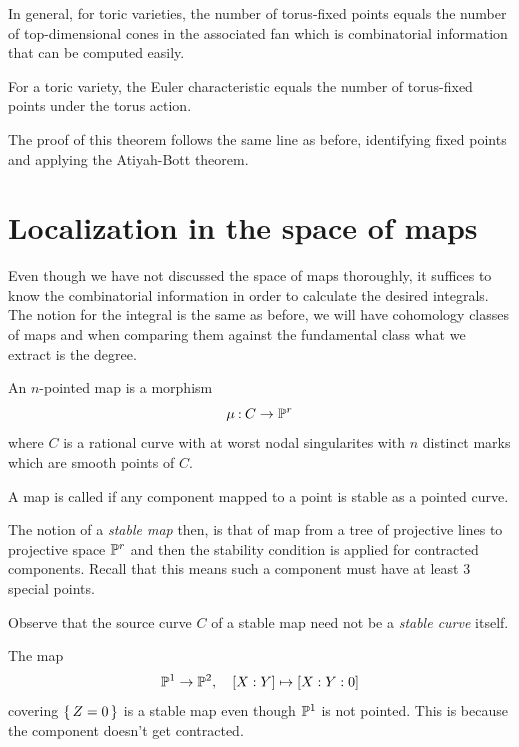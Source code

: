 \documentclass[12pt]{memoir}
\begin{document}
In general, for toric varieties, the number of torus-fixed points equals the number of top-dimensional cones in the associated fan which is combinatorial information that can be computed easily.

\begin{Th}
For a toric variety, the Euler characteristic equals the number of torus-fixed points under the torus action.
\end{Th}

The proof of this theorem follows the same line as before, identifying fixed points and applying the Atiyah-Bott theorem. 

\section{Localization in the space of maps}

Even though we have not discussed the space of maps thoroughly, it suffices to know the combinatorial information in order to calculate the desired integrals. The notion for the integral is the same as before, we will have cohomology classes of maps and when comparing them against the fundamental class what we extract is the degree.

\begin{Def}
An $n$-pointed map is a morphism 
$$\mu\mathbin{:} C\to\mathbb{P}^r$$
where $C$ is a rational curve with at worst nodal singularites with $n$ distinct marks which are smooth points of $C$.\par
A map is called  if any component mapped to a point is stable as a pointed curve.    
\end{Def} 

The notion of a \emph{stable map} then, is that of map from a tree of projective lines to projective space $\mathbb{P}^r$ and then the stability condition is applied for contracted components. Recall that this means such a component must have at least 3 special points.

\begin{Rmk}
    Observe that the source curve $C$ of a stable map need not be a \emph{stable curve} itself.
\end{Rmk}

\begin{Ex}
    The map
    $$\mathbb{P}^1\to\mathbb{P}^2,\quad [X:Y]\mapsto[X:Y:0]$$
    covering $\{\,Z=0\,\}$ is a stable map even though $\mathbb{P}^1$ is not pointed. This is because the component doesn't get contracted. 
\end{Ex}
\end{document}
